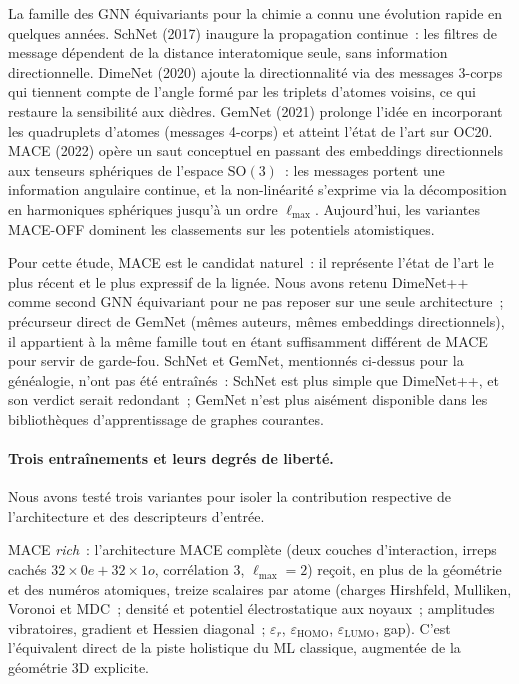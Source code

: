 La famille des GNN équivariants pour la chimie a connu une évolution rapide en quelques années. SchNet\cite{schutt2017schnet} (2017) inaugure la propagation continue~: les filtres de message dépendent de la distance interatomique seule, sans information directionnelle. DimeNet\cite{klicpera2020dimenet} (2020) ajoute la directionnalité via des messages 3-corps qui tiennent compte de l'angle formé par les triplets d'atomes voisins, ce qui restaure la sensibilité aux dièdres. GemNet\cite{gasteiger2021gemnet} (2021) prolonge l'idée en incorporant les quadruplets d'atomes (messages 4-corps) et atteint l'état de l'art sur OC20. MACE\cite{batatia2022mace} (2022) opère un saut conceptuel en passant des embeddings directionnels aux tenseurs sphériques de l'espace $\mathrm{SO}(3)$~: les messages portent une information angulaire continue, et la non-linéarité s'exprime via la décomposition en harmoniques sphériques jusqu'à un ordre $\ell_\text{max}$. Aujourd'hui, les variantes MACE-OFF\cite{kovacs2023maceoff} dominent les classements sur les potentiels atomistiques.

Pour cette étude, MACE est le candidat naturel~: il représente l'état de l'art le plus récent et le plus expressif de la lignée. Nous avons retenu DimeNet++ comme second GNN équivariant pour ne pas reposer sur une seule architecture~; précurseur direct de GemNet (mêmes auteurs, mêmes embeddings directionnels), il appartient à la même famille tout en étant suffisamment différent de MACE pour servir de garde-fou. SchNet et GemNet, mentionnés ci-dessus pour la généalogie, n'ont pas été entraînés~: SchNet est plus simple que DimeNet++, et son verdict serait redondant~; GemNet n'est plus aisément disponible dans les bibliothèques d'apprentissage de graphes courantes.

\paragraph{Trois entraînements et leurs degrés de liberté.}
Nous avons testé trois variantes pour isoler la contribution respective de l'architecture et des descripteurs d'entrée.

MACE \emph{rich}~: l'architecture MACE complète (deux couches d'interaction, irreps cachés $32 \times 0e + 32 \times 1o$, corrélation 3, $\ell_\text{max} = 2$) reçoit, en plus de la géométrie et des numéros atomiques, treize scalaires par atome (charges Hirshfeld, Mulliken, Voronoi et MDC~; densité et potentiel électrostatique aux noyaux~; amplitudes vibratoires, gradient et Hessien diagonal~; $\varepsilon_r$, $\varepsilon_\text{HOMO}$, $\varepsilon_\text{LUMO}$, gap). C'est l'équivalent direct de la piste holistique du ML classique, augmentée de la géométrie 3D explicite.

